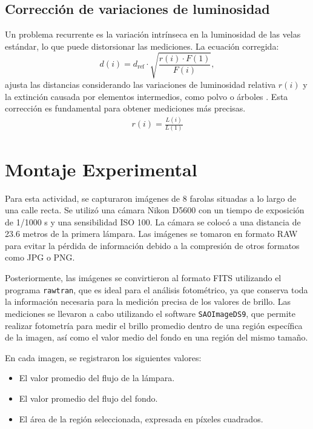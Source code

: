\documentclass[a4paper,12pt]{article}
\begin{document}
\subsection{Corrección de variaciones de luminosidad}

Un problema recurrente es la variación intrínseca en la luminosidad de las velas estándar, lo que puede distorsionar las mediciones. La ecuación corregida:
\begin{equation}
d(i) = d_{\text{ref}} \cdot \sqrt{\frac{r(i) \cdot F(1)}{F(i)}},
\label{eq:d_corr}
\end{equation}
ajusta las distancias considerando las variaciones de luminosidad relativa \(r(i)\) y la extinción causada por elementos intermedios, como polvo o árboles \cite{poessel2016}. Esta corrección es fundamental para obtener mediciones más precisas.
\begin{gather}
r(i) = \frac{L(i)}{L(1)} 
\label{eq:r}
\end{gather}

\section{Montaje Experimental}

Para esta actividad, se capturaron imágenes de 8 farolas situadas a lo largo de una calle recta. Se utilizó una cámara Nikon D5600 con un tiempo de exposición de 1/1000 s y una sensibilidad ISO 100. La cámara se colocó a una distancia de 23.6 metros de la primera lámpara. Las imágenes se tomaron en formato RAW para evitar la pérdida de información debido a la compresión de otros formatos como JPG o PNG.

Posteriormente, las imágenes se convirtieron al formato FITS utilizando el programa \texttt{rawtran}, que es ideal para el análisis fotométrico, ya que conserva toda la información necesaria para la medición precisa de los valores de brillo. Las mediciones se llevaron a cabo utilizando el software \texttt{SAOImageDS9}, que permite realizar fotometría para medir el brillo promedio dentro de una región específica de la imagen, así como el valor medio del fondo en una región del mismo tamaño.

En cada imagen, se registraron los siguientes valores:
\begin{itemize}
    \item El valor promedio del flujo de la lámpara.
    \item El valor promedio del flujo del fondo.
    \item El área de la región seleccionada, expresada en píxeles cuadrados.
\end{itemize}
\end{document}
